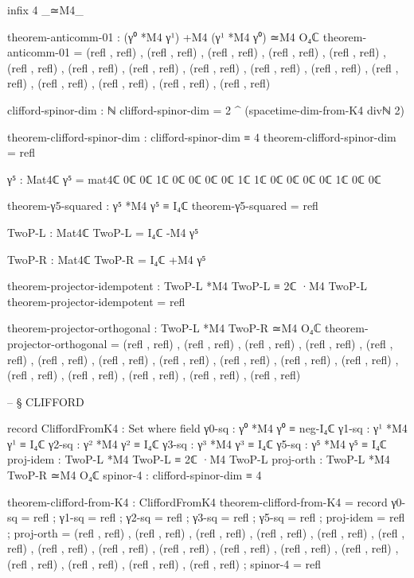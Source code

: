 \documentclass[11pt,a4paper]{book}
\begin{document}
\begin{code}
infix 4 _≃M4_

theorem-anticomm-01 : (γ⁰ *M4 γ¹) +M4 (γ¹ *M4 γ⁰) ≃M4 O₄ℂ
theorem-anticomm-01 =
  (refl , refl) , (refl , refl) , (refl , refl) , (refl , refl) ,
  (refl , refl) , (refl , refl) , (refl , refl) , (refl , refl) ,
  (refl , refl) , (refl , refl) , (refl , refl) , (refl , refl) ,
  (refl , refl) , (refl , refl) , (refl , refl) , (refl , refl)

clifford-spinor-dim : ℕ
clifford-spinor-dim = 2 ^ (spacetime-dim-from-K4 divℕ 2)

theorem-clifford-spinor-dim : clifford-spinor-dim ≡ 4
theorem-clifford-spinor-dim = refl

γ⁵ : Mat4ℂ
γ⁵ = mat4ℂ 0ℂ 0ℂ 1ℂ 0ℂ
            0ℂ 0ℂ 0ℂ 1ℂ
            1ℂ 0ℂ 0ℂ 0ℂ
            0ℂ 1ℂ 0ℂ 0ℂ

theorem-γ5-squared : γ⁵ *M4 γ⁵ ≡ I₄ℂ
theorem-γ5-squared = refl

TwoP-L : Mat4ℂ
TwoP-L = I₄ℂ -M4 γ⁵

TwoP-R : Mat4ℂ
TwoP-R = I₄ℂ +M4 γ⁵

theorem-projector-idempotent :
  TwoP-L *M4 TwoP-L ≡ 2ℂ ·M4 TwoP-L
theorem-projector-idempotent = refl

theorem-projector-orthogonal :
  TwoP-L *M4 TwoP-R ≃M4 O₄ℂ
theorem-projector-orthogonal =
  (refl , refl) , (refl , refl) , (refl , refl) , (refl , refl) ,
  (refl , refl) , (refl , refl) , (refl , refl) , (refl , refl) ,
  (refl , refl) , (refl , refl) , (refl , refl) , (refl , refl) ,
  (refl , refl) , (refl , refl) , (refl , refl) , (refl , refl)


-- § CLIFFORD

record CliffordFromK4 : Set where
  field
    γ0-sq     : γ⁰ *M4 γ⁰ ≡ neg-I₄ℂ
    γ1-sq     : γ¹ *M4 γ¹ ≡ I₄ℂ
    γ2-sq     : γ² *M4 γ² ≡ I₄ℂ
    γ3-sq     : γ³ *M4 γ³ ≡ I₄ℂ
    γ5-sq     : γ⁵ *M4 γ⁵ ≡ I₄ℂ
    proj-idem : TwoP-L *M4 TwoP-L ≡ 2ℂ ·M4 TwoP-L
    proj-orth : TwoP-L *M4 TwoP-R ≃M4 O₄ℂ
    spinor-4  : clifford-spinor-dim ≡ 4

theorem-clifford-from-K4 : CliffordFromK4
theorem-clifford-from-K4 = record
  { γ0-sq     = refl
  ; γ1-sq     = refl
  ; γ2-sq     = refl
  ; γ3-sq     = refl
  ; γ5-sq     = refl
  ; proj-idem = refl
  ; proj-orth = (refl , refl) , (refl , refl) , (refl , refl) , (refl , refl) ,
                (refl , refl) , (refl , refl) , (refl , refl) , (refl , refl) ,
                (refl , refl) , (refl , refl) , (refl , refl) , (refl , refl) ,
                (refl , refl) , (refl , refl) , (refl , refl) , (refl , refl)
  ; spinor-4  = refl
  }


\end{code}
\end{document}
